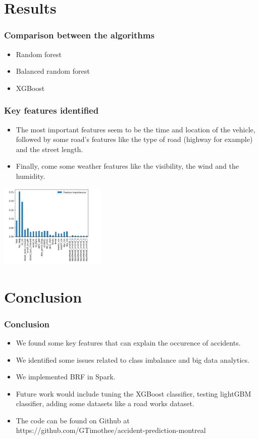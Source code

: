 \documentclass[slidestop,compress,red,mathserif]{beamer}
\begin{document}
\section{Results}

\begin{frame}
	\frametitle{Comparison between the algorithms}
	\begin{itemize}
		\item Random forest
		\item Balanced random forest
		\item XGBoost
	\end{itemize}
\end{frame}

\begin{frame}
	\frametitle{Key features identified}
	\begin{itemize}
		\item The most important features seem to be the time and location of the vehicle, followed by some road's features like the type of road (highway for example) and the street length.
    \item Finally, come some weather features like the visibility, the wind and the humidity.
	\end{itemize}
\centering
\includegraphics[height=4cm, keepaspectratio]{Figures/features.png}
\end{frame}

\section{Conclusion}

\begin{frame}
	\frametitle{Conclusion}
	\begin{itemize}
    \item We found some key features that can explain the occurence of accidents.
    \item We identified some issues related to class imbalance and big data analytics.
    \item We implemented BRF in Spark.
    \item Future work would include tuning the XGBoost classifier, testing lightGBM classifier, adding some datasets like a road works dataset.
    \item The code can be found on Github at https://github.com/GTimothee/accident-prediction-montreal
	\end{itemize}
\end{frame}
\end{document}
